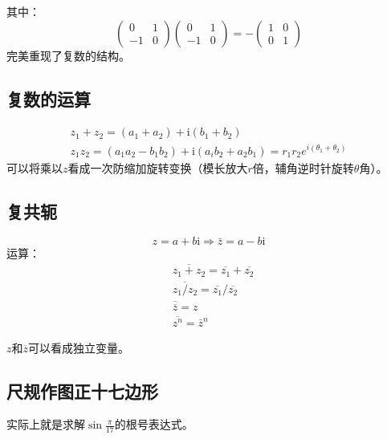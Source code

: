	其中：
	\[\begin{pmatrix}0 & 1 \\-1 & 0\end{pmatrix}\begin{pmatrix}0 & 1 \\-1 & 0\end{pmatrix} = -\begin{pmatrix}1 & 0 \\0 & 1\end{pmatrix} \]
	完美重现了复数的结构。
\subsection{复数的运算}
\begin{gather}
	z_1+z_2 = (a_1+a_2)+\mathrm{i}(b_1+b_2)\\
	z_1 z_2 = (a_1 a_2-b_1 b_2)+\mathrm{i}(a_i b_2+a_2 b_1)=r_1 r_2 e^{i(\theta_1+\theta_2)}
\end{gather}
可以将乘以$z$看成一次防缩加旋转变换（模长放大$r$倍，辅角逆时针旋转$\theta$角）。
\subsection{复共轭}
\[z=a+b\mathrm{i} \Rightarrow \bar{z}=a-b\mathrm{i}\]
运算：
\begin{align}
&\overline{z_1+z_2} = \overline{z_1}+\overline{z_2}\\
&\overline{z_1/z_2} = \overline{z_1}/\overline{z_2}\\
&\overline{\overline{z}} = z\\
&\overline{z^n} = \bar{z}^n
\end{align}

$z$和$\overline{z}$可以看成独立变量。
\subsection{尺规作图正十七边形}
实际上就是求解$\sin \frac{\pi}{17}$的根号表达式。

